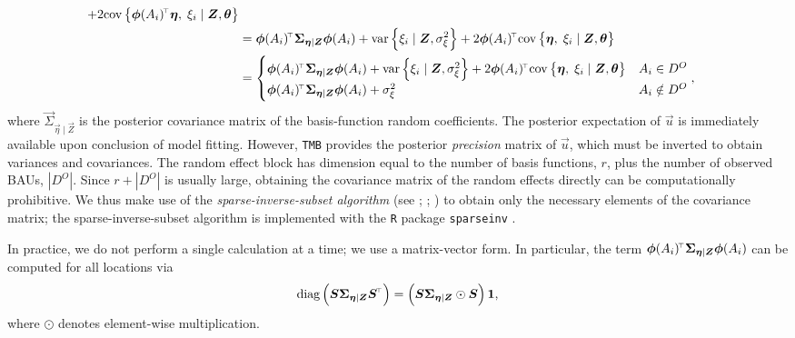 \documentclass[12pt,a4paper]{article}
\begin{document}
\begin{appendices}
\begin{align*}
    +
    2 \covCurlyConditional{ \vec{\phi}(A_i)^\tp\vec{\eta}}{\xi_i }{ \vec{Z}, \vec{\theta} } \nonumber \\
    &=
    \vec{\phi}(A_i)^\tp\vec{\Sigma}_{\vec{\eta} \mid \vec{Z}}\vec{\phi}(A_i)
    +
    \varCurly{\xi_i \mid \vec{Z}, \sigma^2_\xi}
    +
    2\vec{\phi}(A_i)^\tp
     \covCurlyConditional{ \vec{\eta} }{\xi_i }{\vec{Z}, \vec{\theta}} \nonumber \\
    &=
    \begin{cases}
    \vec{\phi}(A_i)^\tp\vec{\Sigma}_{\vec{\eta} \mid \vec{Z}}\vec{\phi}(A_i)
    +
    \varCurly{\xi_i \mid \vec{Z}, \sigma^2_\xi}
    +
    2\vec{\phi}(A_i)^\tp
    \covCurlyConditional{ \vec{\eta} }{ \xi_i }{ \vec{Z}, \vec{\theta} } & A_i\in D^O\\
    \vec{\phi}(A_i)^\tp\vec{\Sigma}_{\vec{\eta} \mid \vec{Z}}\vec{\phi}(A_i)
    +
    \sigma^2_\xi & A_i\notin D^O
    \end{cases},
\end{align*}
where $\vec{\Sigma}_{\vec{\eta} \mid \vec{Z}}$ is the posterior covariance matrix of the basis-function random coefficients.  
The posterior expectation of $\vec{u}$ is immediately available upon conclusion of model fitting.  
 However, \texttt{TMB} provides the posterior \textit{precision} matrix of $\vec{u}$, which must be inverted to obtain variances and covariances. 
The random effect block has dimension equal to the number of basis functions, $r$, plus the number of observed BAUs, $|D^O|$. 
Since $r + |D^O|$ is usually large, obtaining the covariance matrix of the random effects directly can be computationally prohibitive. 
We thus make use of the \textit{sparse-inverse-subset algorithm} (see \cite{Takahashi(1973)SparseInverseSubsetAlgorithm}; \cite{Rue_Martino_2007_Bayesian_inference_for_GMRF}; \cite{Zammit-Mangion_Rougier_2018_sparse_inverse_subset}) to obtain only the necessary elements of the covariance matrix; the sparse-inverse-subset algorithm is implemented with the \texttt{R} package \texttt{sparseinv} \citep{sparseinv_Package}. 


In practice, we do not perform a single calculation at a time; we use a matrix-vector form. In particular, the term $\vec{\phi}(A_i)^\tp   \vec{\Sigma}_{\vec{\eta} \mid \vec{Z}}   \vec{\phi}(A_i)$ can be computed for all locations via 
$$\diag{\vec{S} \vec{\Sigma}_{\vec{\eta} \mid \vec{Z}} \vec{S}^\tp} = \left(\vec{S} \vec{\Sigma}_{\vec{\eta}|\vec{Z}}\odot \vec{S}\right)\vec{1},$$
where $\odot$ denotes element-wise multiplication.



\end{appendices}
\end{document}

